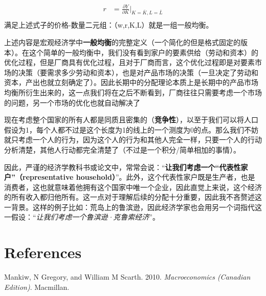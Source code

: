 \documentclass[
  11pt,
  letterpaper,
]{ctexbook}
\newlength{\cslhangindent}
\newenvironment{CSLReferences}[2] %
 {\begin{list}{}{%
  \setlength{\itemindent}{0pt}
  \setlength{\leftmargin}{0pt}
  \setlength{\parsep}{0pt}
  \ifodd #1
   \setlength{\leftmargin}{\cslhangindent}
   \setlength{\itemindent}{-1\cslhangindent}
  \fi
  \setlength{\itemsep}{#2\baselineskip}}}
 {\end{list}}
\begin{document}
\begin{tcolorbox}
\begin{itemize}
\begin{align}
      r &= \frac{\partial Y}{\partial K}|_{K=\bar{K},L=\bar{L}} \\
   \end{align}
  满足上述式子的价格-数量二元组：（w,r,K,L）就是一组一般均衡。
\end{itemize}

上述内容是宏观经济学中\textbf{一般均衡}的完整定义（一个简化的但是格式固定的版本）。在这个简单的一般均衡中，我们没有看到家户的要素供给（劳动和资本）的优化过程，但是厂商具有优化过程，且对于厂商而言，这个优化过程即是对要素市场的决策（要需求多少劳动和资本），也是对产品市场的决策（一旦决定了劳动和资本，产出也就立刻确定了）。因此长期中的分配理论本质上是长期中的产品市场均衡所衍生出来的，这一点我们将在之后不断看到，厂商往往只需要考虑一个市场的问题，另一个市场的优化也就自动解决了

\end{tcolorbox}

现在考虑整个国家的所有人都是同质且密集的（\textbf{竞争性}），以至于我们可以将人口假设为1，每个人都不过是这个长度为1的线上的一个测度为0的点。那么我们不妨就只考虑一个人的行为，因为这个人的行为和其他人完全一样，只要一个人的行动分析清楚，其他人行动都完全清楚了（不过是一个积分/简单相加的事情）。

\begin{tcolorbox}[enhanced jigsaw, coltitle=black, bottomtitle=1mm, opacityback=0, toprule=.15mm, colbacktitle=quarto-callout-note-color!10!white, breakable, arc=.35mm, left=2mm, rightrule=.15mm, toptitle=1mm, opacitybacktitle=0.6, titlerule=0mm, bottomrule=.15mm, colback=white, leftrule=.75mm, title=\textcolor{quarto-callout-note-color}{\faInfo}\hspace{0.5em}{Note}, colframe=quarto-callout-note-color-frame]

因此，严谨的经济学教科书或论文中，常常会说：``\textbf{让我们考虑一个``代表性家户''（representative
household）}''。此外，这个代表性家户既是生产者，也是消费者，这也就意味着他拥有这个国家中唯一个企业，因此直觉上来说，这个经济的所有收入都归他所有。这一点对于理解后续的分配十分重要，因此我不吝赘述这一背景。这样的例子比如：荒岛上的鲁滨逊，因此经济学家也会用另一个词指代这一假设：``\emph{让我们考虑一个鲁滨逊·克鲁索经济}''。

\end{tcolorbox}


\chapter*{References}\label{references}


\label{refs}
\begin{CSLReferences}{1}{0}
Mankiw, N Gregory, and William M Scarth. 2010. \emph{Macroeconomics
(Canadian Edition)}. Macmillan.

\end{CSLReferences}


\backmatter
\end{document}
